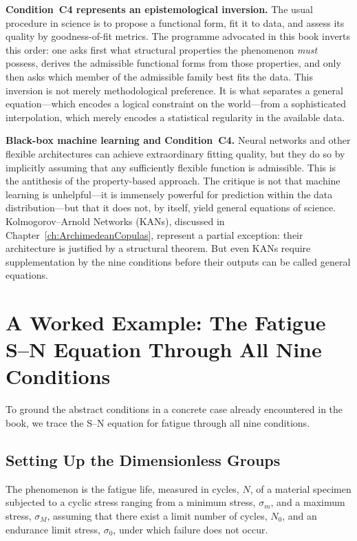 \medskip

\textbf{Condition~C4 represents an epistemological inversion.}
The usual procedure in science is to propose a functional form,
fit it to data, and assess its quality by goodness-of-fit metrics.
The programme advocated in this book inverts this order: one asks
first what structural properties the phenomenon \emph{must}
possess, derives the admissible functional forms from those
properties, and only then asks which member of the admissible
family best fits the data.  This inversion is not merely
methodological preference.  It is what separates a general
equation---which encodes a logical constraint on the world---from
a sophisticated interpolation, which merely encodes a statistical
regularity in the available data.

\medskip

\textbf{Black-box machine learning and Condition~C4.}  Neural
networks and other flexible architectures can achieve extraordinary
fitting quality, but they do so by implicitly assuming that any
sufficiently flexible function is admissible.  This is the
antithesis of the property-based approach.  The critique is not
that machine learning is unhelpful---it is immensely powerful for
prediction within the data distribution---but that it does not,
by itself, yield general equations of science.  Kolmogorov--Arnold
Networks (KANs), discussed in Chapter~\ref{ch:ArchimedeanCopulas},
represent a partial exception: their architecture is justified by a
structural theorem.  But even KANs require supplementation by the
nine conditions before their outputs can be called general
equations.

\section{A Worked Example: The Fatigue S--N Equation Through All Nine
  Conditions}
\label{sec:ucq:worked}

To ground the abstract conditions in a concrete case already
encountered in the book, we trace the S--N equation for fatigue
through all nine conditions.

\subsection{Setting Up the Dimensionless Groups}

The phenomenon is the fatigue life, measured in cycles, $N$, of a material specimen
subjected to a cyclic stress ranging from a minimum stress, $\sigma_m$, and a maximum stress, $\sigma_M$, assuming that there exist a limit number of cycles, $N_0$, and an endurance limit stress, $\sigma_0$, under which failure does not occur.

